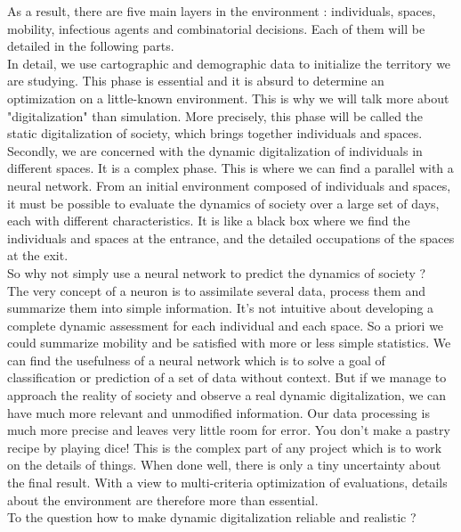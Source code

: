 As a result, there are five main layers in the environment : individuals, spaces, mobility, infectious agents and combinatorial decisions. Each of them will be detailed in the following parts.\\

In detail, we use cartographic and demographic data to initialize the territory we are studying. This phase is essential and it is absurd to determine an optimization on a little-known environment. This is why we will talk more about "digitalization" than simulation. More precisely, this phase will be called the static digitalization of society, which brings together individuals and spaces.\\

Secondly, we are concerned with the dynamic digitalization of individuals in different spaces. It is a complex phase. This is where we can find a parallel with a neural network. From an initial environment composed of individuals and spaces, it must be possible to evaluate the dynamics of society over a large set of days, each with different characteristics. It is like a black box where we find the individuals and spaces at the entrance, and the detailed occupations of the spaces at the exit.\\

So why not simply use a neural network to predict the dynamics of society ?\\

The very concept of a neuron is to assimilate several data, process them and summarize them into simple information. It's not intuitive about developing a complete dynamic assessment for each individual and each space. So a priori we could summarize mobility and be satisfied with more or less simple statistics. We can find the usefulness of a neural network which is to solve a goal of classification or prediction of a set of data without context. But if we manage to approach the reality of society and observe a real dynamic digitalization, we can have much more relevant and unmodified information. Our data processing is much more precise and leaves very little room for error. You don't make a pastry recipe by playing dice! This is the complex part of any project which is to work on the details of things. When done well, there is only a tiny uncertainty about the final result. With a view to multi-criteria optimization of evaluations, details about the environment are therefore more than essential.\\

To the question how to make dynamic digitalization reliable and realistic ?\\

